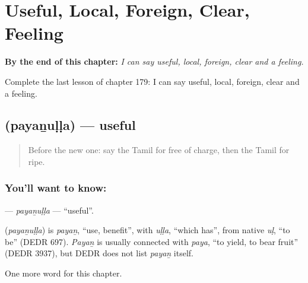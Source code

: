 
\chapter{Useful, Local, Foreign, Clear, Feeling}
\label{ch:ta-useful-local-foreign-clear-feeling}

\begin{chapteropening}
\textbf{By the end of this chapter:} \emph{I can say useful, local, foreign, clear and a feeling.}

Complete the last lesson of chapter 179: I can say useful, local, foreign, clear and a feeling.
\end{chapteropening}

\section[\texorpdfstring{\ta{பயனுள்ள} (payaṉuḷḷa)}{பயனுள்ள (payaṉuḷḷa)}]{ (payaṉuḷḷa) — useful}

\label{lesson:TA-C179-payanulla}



\begin{quote}
Before the new one: say the Tamil for free of charge, then the Tamil for ripe.
\end{quote}

\subsection*{You'll want to know: }
\textbf{} — \emph{payaṉuḷḷa} — \textquotedblleft{}useful\textquotedblright{}.

\begin{cousinweb}
\textbf{} (\emph{payaṉuḷḷa}) is \emph{payaṉ}, \textquotedblleft{}use, benefit\textquotedblright{}, with \emph{uḷḷa}, \textquotedblleft{}which has\textquotedblright{}, from native \emph{uḷ}, \textquotedblleft{}to be\textquotedblright{} (DEDR 697). \emph{Payaṉ} is usually connected with \emph{paya}, \textquotedblleft{}to yield, to bear fruit\textquotedblright{} (DEDR 3937), but DEDR does not list \emph{payaṉ} itself.
\end{cousinweb}

\begin{grammarlens}[title={What you've built}]
One more word for this chapter.
\end{grammarlens}

